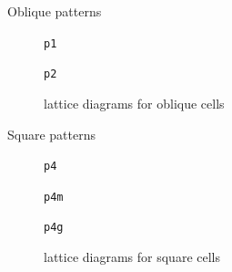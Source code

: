 \documentclass{beamer}
\begin{document}
\begin{frame}{Oblique patterns}
  \begin{figure}
    \centering
    \begin{minipage}[t]{0.50\textwidth}
      \centering
      
      \caption*{\texttt{p1}}
    \end{minipage}\hspace{0cm}%
    \begin{minipage}[t]{0.45\textwidth}
      \centering
      
      \caption*{\texttt{p2}}
    \end{minipage}
    \caption{lattice diagrams for oblique cells}
  \end{figure}
\end{frame}

\begin{frame}{Square patterns}
  \begin{figure}
    \centering
    \begin{minipage}[t]{0.32\textwidth}
      \centering
      
      \caption*{\texttt{p4}}
    \end{minipage}\hfill%
    \begin{minipage}[t]{0.32\textwidth}
      \centering
      
      \caption*{\texttt{p4m}}
    \end{minipage}\hfill
    \begin{minipage}[t]{0.32\textwidth}
      \centering
      
      \caption*{\texttt{p4g}}
    \end{minipage}
    \caption{lattice diagrams for square cells}
  \end{figure}
\end{frame}
\end{document}
